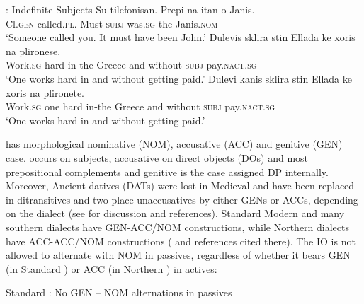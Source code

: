 \documentclass[output=paper]{LSP/langsci}
\begin{document}
\ea\label{ex:anagnost:13}
: Indefinite Subjects  
\ea
\gll  Su tilefonisan. Prepi na itan o Janis.\\
  Cl.\textsc{gen} called.\textsc{pl}\textsc{.} Must \textsc{subj} was.\textsc{sg}  the Janis.\textsc{nom}\\
\glt    ‘Someone called you. It must have been John.’
\ex
\gll  Dulevis sklira stin Ellada ke xoris na plironese.\\
  Work.\textsc{sg} hard in-the Greece and without \textsc{subj}     pay.\textsc{nact.sg}\\
\glt 
  ‘One works hard in  and without getting paid.’
\ex
\gll  Dulevi kanis  sklira stin Ellada ke  xoris  na plironete.\\
  Work.\textsc{sg} one hard in-the Greece and  without \textsc{subj} pay.\textsc{nact.sg}\\
\glt 
  ‘One works hard in  and without getting paid.’
\z
\z

 has morphological nominative (NOM), accusative (ACC) and genitive (GEN) case.  occurs on subjects, accusative on direct objects (DOs) and most prepositional complements and genitive is the case assigned DP internally. Moreover, Ancient  datives (DATs) were lost in Medieval  and have been replaced in ditransitives and two-place unaccusatives by either GENs or ACCs, depending on the dialect (see \citealt{AnagnostopoulouSevdali2015} for discussion and references). Standard Modern  and many southern dialects have GEN-ACC/NOM constructions, while Northern  dialects have ACC-ACC/NOM constructions (\citealt{Dimitriadis1999} and references cited there). The IO is not allowed to alternate with NOM in passives, regardless of whether it bears GEN (in Standard ) or ACC (in Northern ) in actives:

\ea\label{ex:anagnost:14}
Standard : No GEN  – NOM alternations in passives  

\z
\z
\end{document}
